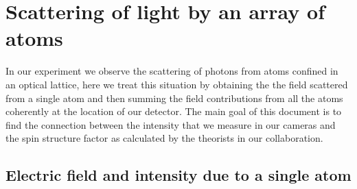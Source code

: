\documentclass[11pt,letter]{article}
\begin{document}
\section{Scattering of light by an array of atoms}

In our experiment we observe the scattering of photons from atoms confined in
an optical lattice, here we treat this situation by obtaining the the field
scattered from a single atom and then summing the field contributions from all
the atoms coherently at the location of our detector.  The main goal of this
document is to find the connection between the intensity that we measure in our
cameras and the spin structure factor as calculated by the theorists in our
collaboration.  

\subsection{Electric field and intensity due to a single atom}
\end{document}
